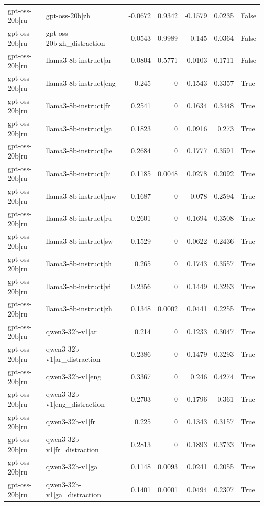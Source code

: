 \begin{table}
\begin{tabular}{l l r r r r l}
gpt-oss-20b|ru & gpt-oss-20b|zh & -0.0672 & 0.9342 & -0.1579 & 0.0235 & False \\
gpt-oss-20b|ru & gpt-oss-20b|zh_distraction & -0.0543 & 0.9989 & -0.145 & 0.0364 & False \\
gpt-oss-20b|ru & llama3-8b-instruct|ar & 0.0804 & 0.5771 & -0.0103 & 0.1711 & False \\
gpt-oss-20b|ru & llama3-8b-instruct|eng & 0.245 & 0 & 0.1543 & 0.3357 & True \\
gpt-oss-20b|ru & llama3-8b-instruct|fr & 0.2541 & 0 & 0.1634 & 0.3448 & True \\
gpt-oss-20b|ru & llama3-8b-instruct|ga & 0.1823 & 0 & 0.0916 & 0.273 & True \\
gpt-oss-20b|ru & llama3-8b-instruct|he & 0.2684 & 0 & 0.1777 & 0.3591 & True \\
gpt-oss-20b|ru & llama3-8b-instruct|hi & 0.1185 & 0.0048 & 0.0278 & 0.2092 & True \\
gpt-oss-20b|ru & llama3-8b-instruct|raw & 0.1687 & 0 & 0.078 & 0.2594 & True \\
gpt-oss-20b|ru & llama3-8b-instruct|ru & 0.2601 & 0 & 0.1694 & 0.3508 & True \\
gpt-oss-20b|ru & llama3-8b-instruct|sw & 0.1529 & 0 & 0.0622 & 0.2436 & True \\
gpt-oss-20b|ru & llama3-8b-instruct|th & 0.265 & 0 & 0.1743 & 0.3557 & True \\
gpt-oss-20b|ru & llama3-8b-instruct|vi & 0.2356 & 0 & 0.1449 & 0.3263 & True \\
gpt-oss-20b|ru & llama3-8b-instruct|zh & 0.1348 & 0.0002 & 0.0441 & 0.2255 & True \\
gpt-oss-20b|ru & qwen3-32b-v1|ar & 0.214 & 0 & 0.1233 & 0.3047 & True \\
gpt-oss-20b|ru & qwen3-32b-v1|ar_distraction & 0.2386 & 0 & 0.1479 & 0.3293 & True \\
gpt-oss-20b|ru & qwen3-32b-v1|eng & 0.3367 & 0 & 0.246 & 0.4274 & True \\
gpt-oss-20b|ru & qwen3-32b-v1|eng_distraction & 0.2703 & 0 & 0.1796 & 0.361 & True \\
gpt-oss-20b|ru & qwen3-32b-v1|fr & 0.225 & 0 & 0.1343 & 0.3157 & True \\
gpt-oss-20b|ru & qwen3-32b-v1|fr_distraction & 0.2813 & 0 & 0.1893 & 0.3733 & True \\
gpt-oss-20b|ru & qwen3-32b-v1|ga & 0.1148 & 0.0093 & 0.0241 & 0.2055 & True \\
gpt-oss-20b|ru & qwen3-32b-v1|ga_distraction & 0.1401 & 0.0001 & 0.0494 & 0.2307 & True \\

\end{tabular}
\end{table}
